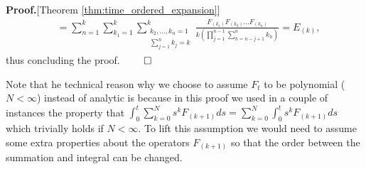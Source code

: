 \documentclass[twocolumn]{autart}    %
\newenvironment{proof}{\textbf{Proof.}}{\hfill $\qed$}
\begin{document}
\begin{proof}[Theorem \ref{thm:time_ordered_expansion}]
\begin{align*}
        &= \sum_{n=1}^{k} \sum_{k_1=1}^{k} \sum_{\substack{{k_2,\dots,k_{n} = 1}\\{\sum_{j=1}^{n}k_{j}=k}}}^{k} \frac{F_{(k_1)} F_{(k_2)}\dots F_{(k_{n})}}{k(\prod_{j=1}^{n-1} \sum_{h=n-j+1}^{n} k_{h})} = E_{(k)},
    \end{align*}    
    thus concluding the proof.
\end{proof}

Note that he technical reason why we choose to assume $F_t$ to be polynomial ($N<\infty$) instead of analytic is because in this proof we used in a couple of instances the property that $\int_0^t \sum_{k=0}^N s^k F_{(k+1)} ds = \sum_{k=0}^N \int_0^t s^k F_{(k+1)} ds $ which trivially holds if $N<\infty$. To lift this assumption we would need to assume some extra properties about the operators $F_{(k+1)}$ so that the order between the summation and integral can be changed.
\end{document}
